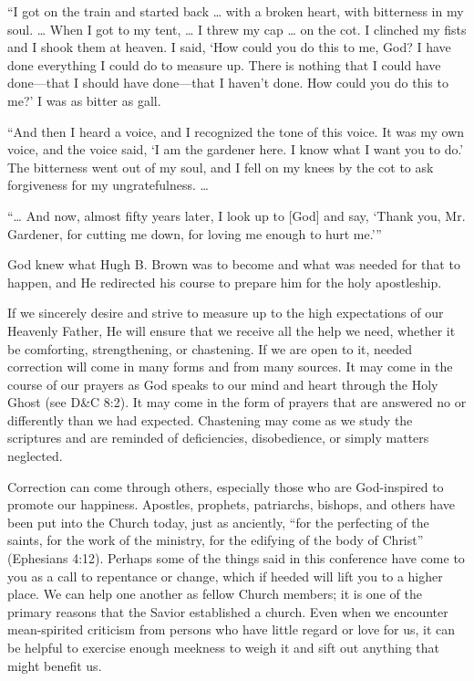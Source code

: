 \documentclass[letterpaper, 11pt]{report}
\begin{document}
“I got on the train and started back … with a broken heart, with bitterness in my soul. … When I got to my tent, … I threw my cap … on the cot. I clinched my fists and I shook them at heaven. I said, ‘How could you do this to me, God? I have done everything I could do to measure up. There is nothing that I could have done—that I should have done—that I haven’t done. How could you do this to me?’ I was as bitter as gall.

“And then I heard a voice, and I recognized the tone of this voice. It was my own voice, and the voice said, ‘I am the gardener here. I know what I want you to do.’ The bitterness went out of my soul, and I fell on my knees by the cot to ask forgiveness for my ungratefulness. …

“… And now, almost fifty years later, I look up to [God] and say, ‘Thank you, Mr. Gardener, for cutting me down, for loving me enough to hurt me.’”

God knew what Hugh B. Brown was to become and what was needed for that to happen, and He redirected his course to prepare him for the holy apostleship.

If we sincerely desire and strive to measure up to the high expectations of our Heavenly Father, He will ensure that we receive all the help we need, whether it be comforting, strengthening, or chastening. If we are open to it, needed correction will come in many forms and from many sources. It may come in the course of our prayers as God speaks to our mind and heart through the Holy Ghost (see D\&C 8:2). It may come in the form of prayers that are answered no or differently than we had expected. Chastening may come as we study the scriptures and are reminded of deficiencies, disobedience, or simply matters neglected.

Correction can come through others, especially those who are God-inspired to promote our happiness. Apostles, prophets, patriarchs, bishops, and others have been put into the Church today, just as anciently, “for the perfecting of the saints, for the work of the ministry, for the edifying of the body of Christ” (Ephesians 4:12). Perhaps some of the things said in this conference have come to you as a call to repentance or change, which if heeded will lift you to a higher place. We can help one another as fellow Church members; it is one of the primary reasons that the Savior established a church. Even when we encounter mean-spirited criticism from persons who have little regard or love for us, it can be helpful to exercise enough meekness to weigh it and sift out anything that might benefit us.
\end{document}
